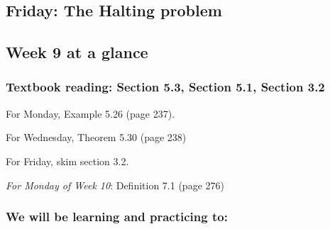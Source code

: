 


\newpage
\subsection*{Friday: The Halting problem}



\newpage

\subsection*{Week 9 at a glance}

\vspace{-10pt}

\subsubsection*{Textbook reading: Section 5.3, Section 5.1, Section 3.2}

\vspace{-10pt}

For Monday, Example 5.26 (page 237).

For Wednesday,  Theorem 5.30 (page 238) 

For Friday, skim section 3.2.

{\it For Monday of Week 10}: Definition 7.1 (page 276)
\vspace{-20pt}

\subsubsection*{We will be learning and practicing to:}

\vspace{-20pt}

